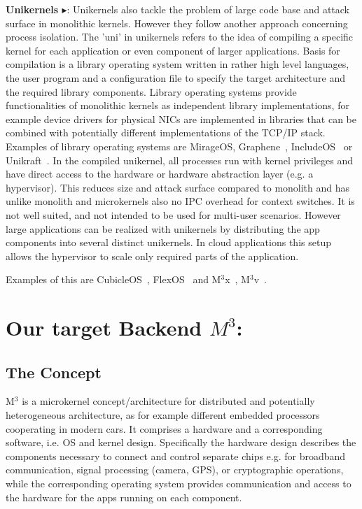 \textbf{Unikernels\cite{madhavapeddy2014unikernels} $\blacktriangleright$}: Unikernels also tackle the problem of large code base and attack surface in monolithic kernels. However they follow another approach concerning process isolation. The 'uni' in unikernels refers to the idea of compiling a specific kernel for each application or even component of larger applications. Basis for compilation is a library operating system written in rather high level languages, the user program and a configuration file to specify the target architecture and the required library components. Library operating systems provide functionalities of monolithic kernels as independent library implementations, for example device drivers for physical NICs are implemented in libraries that can be combined with potentially different implementations of the TCP/IP stack. Examples of library operating systems are  MirageOS\cite{madhavapeddy2013unikernels}, Graphene~\cite{tsai2014Graphene}, IncludeOS~\cite{bratterud2015includeos} or Unikraft~\cite{kuenzer2021unikraft}.
In the compiled unikernel, all processes run with kernel privileges and have direct access to the hardware or hardware abstraction layer (e.g. a hypervisor). This reduces size and attack surface compared to monolith and has unlike monolith and microkernels also no IPC overhead for context switches. 
It is not well suited, and not intended to be used for multi-user scenarios. However large applications can be realized with unikernels by distributing the app components into several distinct unikernels. In cloud applications this setup allows the hypervisor to scale only required parts of the application. 

Examples of this are CubicleOS~\cite{sartakov2021cubicleos}, FlexOS~\cite{lefeuvre2021flexos} and M$^3$x~\cite{Asmussen:M3x}, M$^3$v~\cite{Asmussen:M3v}.


\section{Our target Backend $M^3$:}
\subsection{The Concept}
M$^3$\cite{Asmussen:M3x} is a microkernel concept/architecture for distributed and potentially heterogeneous architecture, as for example different embedded processors cooperating in modern cars. It comprises a hardware and a corresponding software, i.e. OS and kernel design. Specifically the hardware design describes the components necessary to connect and control separate chips e.g. for broadband communication, signal processing (camera, GPS), or cryptographic operations, while the corresponding operating system provides communication and access to the hardware for the apps running on each component.

